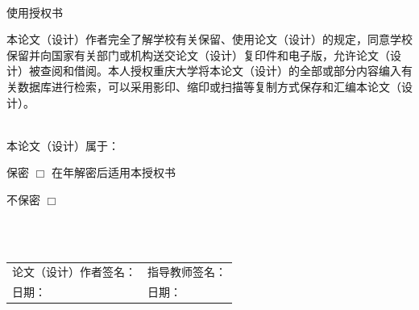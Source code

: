 \documentclass[UTF8,a4paper,12pt]{ctexart}
\numberwithin{equation}{section}
\numberwithin{figure}{section}
\numberwithin{table}{section}
\begin{document}
~\\
\begin{center}
\heiti{} 使用授权书
\end{center}

\songti{}
本论文（设计）作者完全了解学校有关保留、使用论文（设计）的规定，同意学校保留并向国家有关部门或机构送交论文（设计）复印件和电子版，允许论文（设计）被查阅和借阅。本人授权重庆大学将本论文（设计）的全部或部分内容编入有关数据库进行检索，可以采用影印、缩印或扫描等复制方式保存和汇编本论文（设计）。

~\\
本论文（设计）属于：\par
保\quad 密 $\Box$ \quad 在\underline{\qquad}年解密后适用本授权书\par
不保密 $\Box$

~\\
~\\
\begin{flushleft}
\begin{tabular}{ll}
论文（设计）作者签名：\underline{\hspace{6em}} & 指导教师签名：\underline{\hspace{6em}}\\
日期：\underline{\hspace{6em}} & 日期：\underline{\hspace{6em}}\\
\end{tabular}
\end{flushleft}
\end{document}
